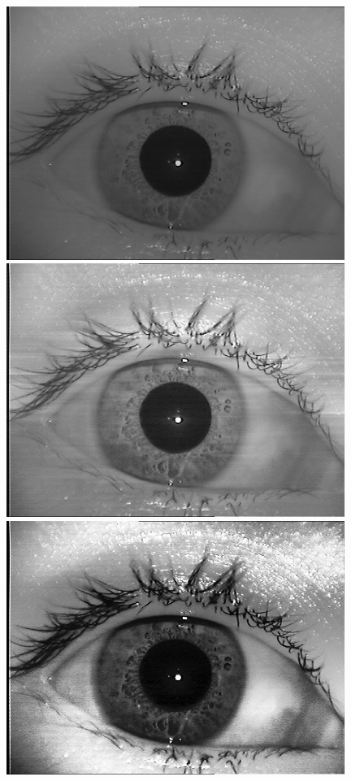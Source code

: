 \documentclass[a0,landscape,spanish]{a0poster}
\begin{document}
\begin{multicols}{3}
\begin{figure}[H]
    \centering
    \captionsetup{justification=centering}
    \includegraphics[width=11cm]{retina2original.jpg}
    \hspace{1pt}
    \includegraphics[width=11cm]{retina2clahe.jpg}
    \hspace{1pt}
    \includegraphics[width=11cm]{retina2clahelicen.jpg}
  

\end{figure}
\end{multicols}
\end{document}
